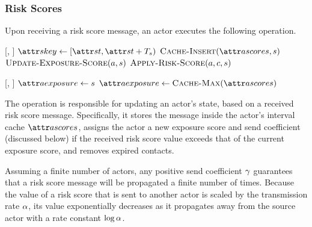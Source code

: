 \subsubsection{Risk Scores}

Upon receiving a risk score message, an actor executes the following operation.
%
\begin{function}{\nHandleRiskScore}[\vActor, \vScore]
    \State $\aScoreKey \assign [\aScoreTime, \aScoreTime + \pScoreExpiry)$
    \State $\cCacheInsert[\aActorScores, \vScore]$
    \State $\cUpdateExposureScore[\vActor, \vScore]$
    \ForEach{$\vContact \in \aActorContacts$}
      \State $\cApplyRiskScore[\vActor, \vContact, \vScore]$
    \EndFor
  \EndIf
\end{function}
%
\begin{function}{\nUpdateExposureScore}[\vActor, \vScore]
  \If{$\aActorExposureValue < \aScoreValue$}
    \State $\aActorExposure \assign \vScore$
    \State $\aActorExposure \assign \cCacheMax[\aActorScores]$
  \EndIf
\end{function}
%
The  operation is responsible for updating an actor's state, based on a received risk score message. Specifically, it stores the message inside the actor's interval cache $\aActorScores$, assigns the actor a new exposure score and send coefficient (discussed below) if the received risk score value exceeds that of the current exposure score, and removes expired contacts.


Assuming a finite number of actors, any positive send coefficient $\gamma$ guarantees that a risk score message will be propagated a finite number of times. Because the value of a risk score that is sent to another actor is scaled by the transmission rate $\alpha$, its value exponentially decreases as it propagates away from the source actor with a rate constant $\log \alpha$.

